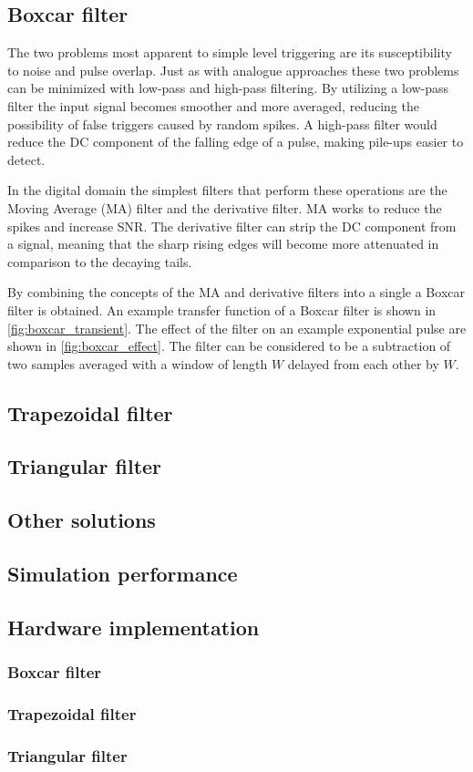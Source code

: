 \subsection{Boxcar filter}

The two problems most apparent to simple level triggering 
are its susceptibility to noise and pulse overlap.
Just as with analogue approaches these two problems 
can be minimized with low-pass and high-pass filtering.
By utilizing a low-pass filter the input signal becomes 
smoother and more averaged, reducing the possibility of 
false triggers caused by random spikes. A high-pass filter
would reduce the DC component of the falling edge of a pulse,
making pile-ups easier to detect.


In the digital domain the simplest filters that perform
these operations are the Moving Average (MA) filter and 
the derivative filter. MA works to reduce the spikes and increase 
SNR. The derivative filter can strip the DC component from
a signal, meaning that the sharp rising edges will become
more attenuated in comparison to the decaying tails.


By combining the concepts of the MA and derivative filters
into a single a Boxcar filter is obtained. An example transfer
function of a Boxcar filter is shown in \autoref{fig:boxcar_transient}.
The effect of the filter on an example exponential pulse are shown 
in \autoref{fig:boxcar_effect}. The filter can be considered
to be a subtraction of two samples averaged with a window
of length $W$ delayed from each other by $W$.



\subsection{Trapezoidal filter}
\subsection{Triangular filter}
\subsection{Other solutions}
\subsection{Simulation performance}
\subsection{Hardware implementation}
\subsubsection{Boxcar filter}
\subsubsection{Trapezoidal filter}
\subsubsection{Triangular filter}
